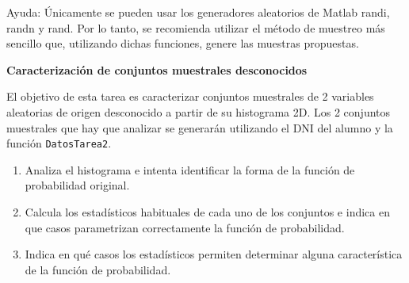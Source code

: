 \documentclass[10pt,twoside,spanish,a4paper]{article}
\begin{document}
\begin{itemize}
	\hspace{0.2cm}\color{blue}Ayuda: \color{black} \color{black} \'{U}nicamente se pueden usar los generadores aleatorios de Matlab  \color{blue}randi\color{black}, \color{blue}randn \color{black} y \color{blue}rand\color{black}.  Por lo tanto, se recomienda utilizar el método de muestreo más sencillo que, utilizando dichas funciones, genere las muestras propuestas.

	\itemP  \textbf{Caracterización de conjuntos muestrales desconocidos}

	El objetivo de esta tarea es caracterizar conjuntos muestrales de 2 variables aleatorias de origen desconocido a partir de su histograma 2D. Los 2 conjuntos muestrales que hay que analizar se generarán utilizando el DNI del alumno y la función \color{blue}\texttt{DatosTarea2}\color{black}.
	\begin{enumerate}[label=\alph*)]
		\item Analiza el histograma e intenta identificar la forma de la función de probabilidad original.
		\item Calcula los estadísticos habituales de cada uno de los conjuntos e indica en que casos parametrizan correctamente la función de probabilidad.
		\item Indica en qué casos los estadísticos permiten determinar alguna característica de la función de probabilidad.
	\end{enumerate}
\end{itemize}
\end{document}
